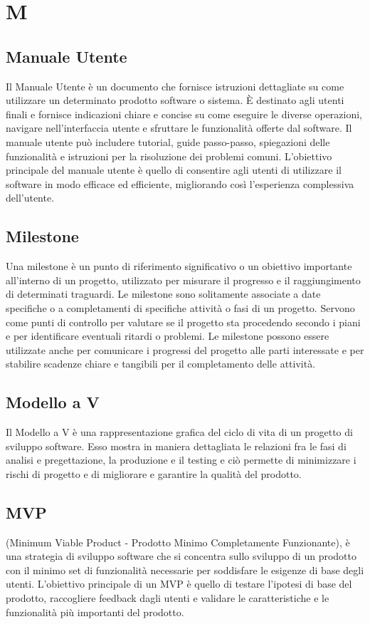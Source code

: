\section*{M} 
\subsection*{Manuale Utente} 
Il Manuale Utente è un documento che fornisce istruzioni dettagliate su come utilizzare un determinato prodotto software o sistema. È destinato agli utenti finali e fornisce indicazioni chiare e concise su come eseguire le diverse operazioni, navigare nell'interfaccia utente e sfruttare le funzionalità offerte dal software. Il manuale utente può includere tutorial, guide passo-passo, spiegazioni delle funzionalità e istruzioni per la risoluzione dei problemi comuni. L'obiettivo principale del manuale utente è quello di consentire agli utenti di utilizzare il software in modo efficace ed efficiente, migliorando così l'esperienza complessiva dell'utente.
\subsection*{Milestone} 
Una milestone è un punto di riferimento significativo o un obiettivo importante all'interno di un progetto, utilizzato per misurare il progresso e il raggiungimento di determinati traguardi. Le milestone sono solitamente associate a date specifiche o a completamenti di specifiche attività o fasi di un progetto. Servono come punti di controllo per valutare se il progetto sta procedendo secondo i piani e per identificare eventuali ritardi o problemi. Le milestone possono essere utilizzate anche per comunicare i progressi del progetto alle parti interessate e per stabilire scadenze chiare e tangibili per il completamento delle attività.
\subsection*{Modello a V} 
Il Modello a V è una rappresentazione grafica del ciclo di vita di un progetto di sviluppo software. Esso mostra in maniera dettagliata le relazioni fra le fasi di analisi e pregettazione, la  produzione e il testing e ciò permette di minimizzare i rischi di progetto e di migliorare e garantire la qualità del prodotto.
\subsection*{MVP} 
(Minimum Viable Product - Prodotto Minimo Completamente Funzionante), è una strategia di sviluppo software che si concentra sullo sviluppo di un prodotto con il minimo set di funzionalità necessarie per soddisfare le esigenze di base degli utenti. L'obiettivo principale di un MVP è quello di testare l'ipotesi di base del prodotto, raccogliere feedback dagli utenti e validare le caratteristiche e le funzionalità più importanti del prodotto.
